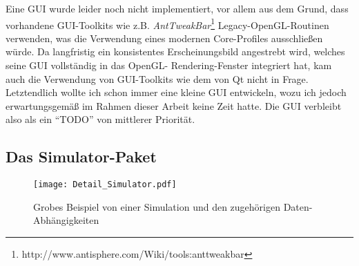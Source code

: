 	Eine GUI wurde leider noch nicht implementiert, vor allem aus dem Grund, dass vorhandene GUI-Toolkits wie z.B.
	\emph{AntTweakBar}\footnote{http://www.antisphere.com/Wiki/tools:anttweakbar} Legacy-OpenGL-Routinen verwenden,
	was die Verwendung eines modernen Core-Profiles ausschließen würde.
	Da langfristig ein konsistentes Erscheinungsbild angestrebt wird, welches seine GUI vollständig in das 
	OpenGL- Rendering-Fenster integriert hat, kam auch die  Verwendung von GUI-Toolkits wie dem von Qt nicht in Frage.\\
	Letztendlich wollte ich schon immer eine kleine GUI entwickeln, wozu ich jedoch erwartungsgemäß im Rahmen dieser
	Arbeit keine Zeit hatte. Die GUI verbleibt also als ein "`TODO"' von mittlerer Priorität.




\subsection{Das Simulator-Paket}

	\begin{figure}[!h]
		 \texttt{[image: Detail\_Simulator.pdf]}
		\caption{Grobes Beispiel von einer Simulation und den zugehörigen Daten-Abhängigkeiten}
		\label{fig:detailSimulator}
	\end{figure}


